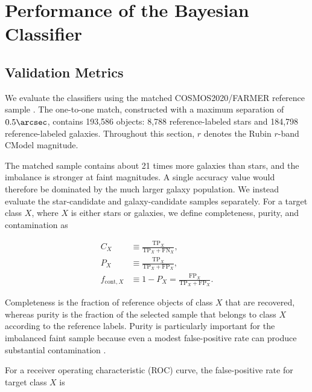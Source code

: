\providecommand{\FloatBarrier}{\clearpage}

\section{Performance of the Bayesian Classifier}
\label{sec:performance}

\subsection{Validation Metrics}
\label{sec:validation-metrics}

We evaluate the classifiers using the matched COSMOS2020/FARMER reference
sample \citep{Weaver2022}.  The one-to-one match, constructed with a maximum
separation of $0.5\arcsec$, contains 193,586 objects: 8,788 reference-labeled
stars and 184,798 reference-labeled galaxies.  Throughout this section, $r$
denotes the Rubin $r$-band CModel magnitude.

The matched sample contains about 21 times more galaxies than stars, and the
imbalance is stronger at faint magnitudes.  A single accuracy value would
therefore be dominated by the much larger galaxy population.  We instead
evaluate the star-candidate and galaxy-candidate samples separately.  For a
target class $X$, where $X$ is either stars or galaxies, we define
completeness, purity, and contamination as

\begin{align}
    C_X &\equiv \frac{\mathrm{TP}_X}
                       {\mathrm{TP}_X+\mathrm{FN}_X},
    \label{eq:completeness}\\
    P_X &\equiv \frac{\mathrm{TP}_X}
                       {\mathrm{TP}_X+\mathrm{FP}_X},
    \label{eq:purity}\\
    f_{\mathrm{cont},X} &\equiv 1-P_X
      =\frac{\mathrm{FP}_X}{\mathrm{TP}_X+\mathrm{FP}_X}.
    \label{eq:contamination}
\end{align}

Completeness is the fraction of reference objects of class $X$ that are
recovered, whereas purity is the fraction of the selected sample that belongs
to class $X$ according to the reference labels.  Purity is particularly
important for the imbalanced faint sample because even a modest false-positive
rate can produce substantial contamination \citep{SaitoRehmsmeier2015}.

For a receiver operating characteristic (ROC) curve, the false-positive rate
for target class $X$ is

